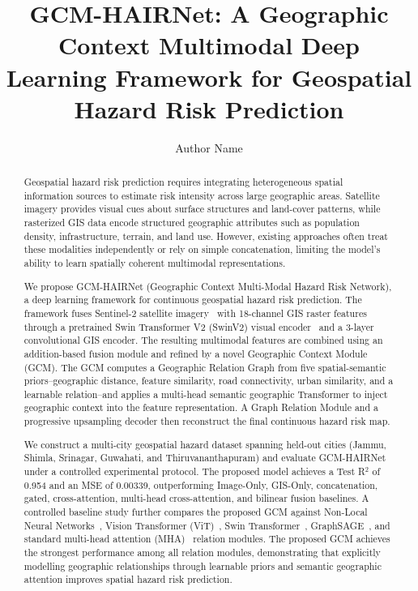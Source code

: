 \documentclass[sigconf, review=true]{acmart}
\begin{document}
\title{GCM-HAIRNet: A Geographic Context Multimodal Deep Learning Framework for Geospatial Hazard Risk Prediction}

\author{Author Name}

\renewcommand{\shortauthors}{Author et al.}

\begin{abstract}
Geospatial hazard risk prediction requires integrating heterogeneous spatial information sources to estimate risk intensity across large geographic areas. Satellite imagery provides visual cues about surface structures and land-cover patterns, while rasterized GIS data encode structured geographic attributes such as population density, infrastructure, terrain, and land use. However, existing approaches often treat these modalities independently or rely on simple concatenation, limiting the model's ability to learn spatially coherent multimodal representations.

We propose GCM-HAIRNet (Geographic Context Multi-Modal Hazard Risk Network), a deep learning framework for continuous geospatial hazard risk prediction. The framework fuses Sentinel-2 satellite imagery~\cite{drusch2012sentinel} with 18-channel GIS raster features through a pretrained Swin Transformer V2 (SwinV2) visual encoder~\cite{liu2022swinv2} and a 3-layer convolutional GIS encoder. The resulting multimodal features are combined using an addition-based fusion module and refined by a novel Geographic Context Module (GCM). The GCM computes a Geographic Relation Graph from five spatial-semantic priors--geographic distance, feature similarity, road connectivity, urban similarity, and a learnable relation--and applies a multi-head semantic geographic Transformer to inject geographic context into the feature representation. A Graph Relation Module and a progressive upsampling decoder then reconstruct the final continuous hazard risk map.

We construct a multi-city geospatial hazard dataset spanning held-out cities (Jammu, Shimla, Srinagar, Guwahati, and Thiruvananthapuram) and evaluate GCM-HAIRNet under a controlled experimental protocol. The proposed model achieves a Test R$^2$ of 0.954 and an MSE of 0.00339, outperforming Image-Only, GIS-Only, concatenation, gated, cross-attention, multi-head cross-attention, and bilinear fusion baselines. A controlled baseline study further compares the proposed GCM against Non-Local Neural Networks~\cite{wang2018nonlocal}, Vision Transformer (ViT)~\cite{dosovitskiy2021vit}, Swin Transformer~\cite{liu2021swin}, GraphSAGE~\cite{hamilton2017graphsage}, and standard multi-head attention (MHA)~\cite{vaswani2017attention} relation modules. The proposed GCM achieves the strongest performance among all relation modules, demonstrating that explicitly modelling geographic relationships through learnable priors and semantic geographic attention improves spatial hazard risk prediction.
\end{abstract}
\end{document}
